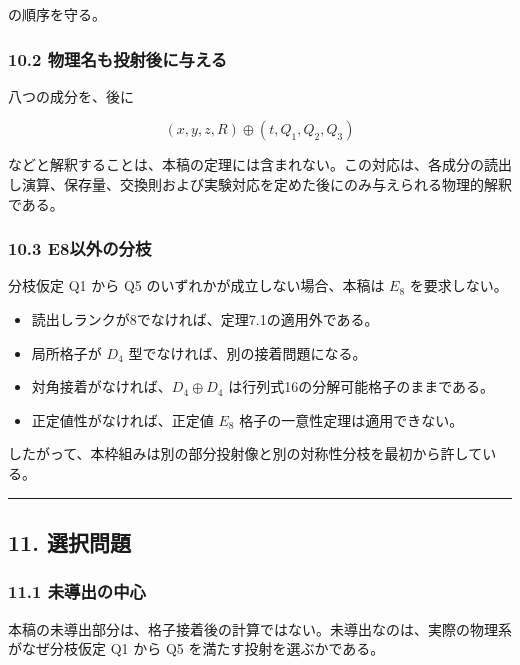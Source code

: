 \documentclass[
  a4paper,
  ja=minimal,
  xelatex,
  paragraph-mark={},
]{bxjsarticle}
\providecommand{\tightlist}{%
  \setlength{\itemsep}{0pt}\setlength{\parskip}{0pt}}
\begin{document}
の順序を守る。

\subsubsection{10.2
物理名も投射後に与える}\label{ux7269ux7406ux540dux3082ux6295ux5c04ux5f8cux306bux4e0eux3048ux308b}

八つの成分を、後に

\[
(x,y,z,R)
\oplus
(t,Q_1,Q_2,Q_3)
\]

などと解釈することは、本稿の定理には含まれない。この対応は、各成分の読出し演算、保存量、交換則および実験対応を定めた後にのみ与えられる物理的解釈である。

\subsubsection{10.3
E8以外の分枝}\label{e8ux4ee5ux5916ux306eux5206ux679d}

分枝仮定 Q1 から Q5 のいずれかが成立しない場合、本稿は \(E_8\)
を要求しない。

\begin{itemize}
\tightlist
\item
  読出しランクが8でなければ、定理7.1の適用外である。
\item
  局所格子が \(D_4\) 型でなければ、別の接着問題になる。
\item
  対角接着がなければ、\(D_4\oplus D_4\)
  は行列式16の分解可能格子のままである。
\item
  正定値性がなければ、正定値 \(E_8\) 格子の一意性定理は適用できない。
\end{itemize}

したがって、本枠組みは別の部分投射像と別の対称性分枝を最初から許している。

\begin{center}\rule{0.5\linewidth}{0.5pt}\end{center}

\subsection{11. 選択問題}\label{ux9078ux629eux554fux984c}

\subsubsection{11.1
未導出の中心}\label{ux672aux5c0eux51faux306eux4e2dux5fc3}

本稿の未導出部分は、格子接着後の計算ではない。未導出なのは、実際の物理系がなぜ分枝仮定
Q1 から Q5 を満たす投射を選ぶかである。
\end{document}
